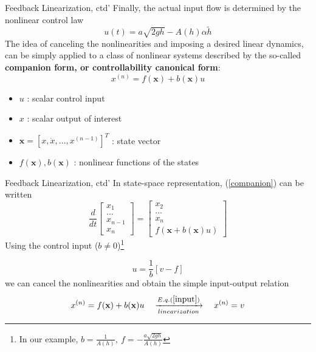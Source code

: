 \documentclass{beamer}
\begin{document}
  \begin{frame}{Feedback Linearization, ctd'}
  Finally, the actual input flow is determined by the nonlinear control law
  $$ u(t) = a\sqrt{2gh} - A(h)\alpha \widetilde{h} $$
    The idea of canceling the nonlinearities and imposing a desired linear dynamics, can be simply applied to a class of nonlinear systems described by the so-called \textbf{companion form, or controllability canonical form}:
    \begin{equation}\label{companion}
      x^{(n)} = f(\textbf{x}) + b(\textbf{x})u
    \end{equation}
    \vspace{-15pt}
    \begin{itemize}
      \item $u$ : scalar control input
      \item $x$ : scalar output of interest
      \item $\textbf{x} = \left[ x,\dot{x},\dots,x^{(n-1)}\right]^{T}$ : state vector
      \item $f(\textbf{x}), b(\textbf{x})$ : nonlinear functions of the states
    \end{itemize}
  \end{frame}


  \begin{frame}{Feedback Linearization, ctd'}
  In state-space representation, (\ref{companion}) can be written
  $$
  \frac{d}{dt}\left[\begin{array}{c}
                      x_{1} \\
                      \dots \\
                      x_{n-1} \\
                      x_{n}
                    \end{array}\right] = \left[\begin{array}{c}
                                                 x_{2} \\
                                                 \dots \\
                                                 x_{n} \\
                                                 f(\textbf{x}+b(\textbf{x})u)
                                               \end{array}\right]
  $$
  Using the control input ($b \neq 0$)\footnote{In our example, $b=\frac{1}{A(h)}, ~ f=-\frac{a\sqrt{2gh}}{A(h)}$}

  \begin{equation}\label{input}
    u = \frac{1}{b}\left[v-f\right]
  \end{equation}
  we can cancel the nonlinearities and obtain the simple input-output relation
  $$ x^{(n)} = f(\textbf{x}) + b(\textbf{x})u \quad \xrightarrow[linearization]{E.q.(\ref{input})} \quad x^{(n)} = v $$
  \end{frame}
\end{document}
